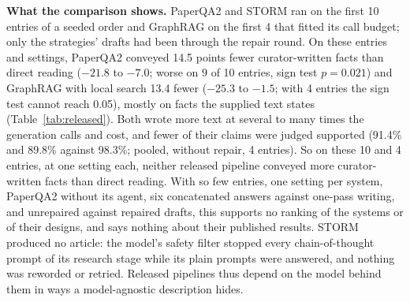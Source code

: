 \documentclass{article} %
\begin{document}
\textbf{What the comparison shows.} PaperQA2 and STORM ran on the first 10 entries of a seeded order and GraphRAG on the first 4 that fitted its call budget; only the strategies' drafts had been through the repair round. On these entries and settings, PaperQA2 conveyed 14.5 points fewer curator-written facts than direct reading ($-21.8$ to $-7.0$; worse on 9 of 10 entries, sign test $p=0.021$) and GraphRAG with local search 13.4 fewer ($-25.3$ to $-1.5$; with 4 entries the sign test cannot reach 0.05), mostly on facts the supplied text states (Table~\ref{tab:released}). Both wrote more text at several to many times the generation calls and cost, and fewer of their claims were judged supported (91.4\% and 89.8\% against 98.3\%; pooled, without repair, 4 entries). So on these 10 and 4 entries, at one setting each, neither released pipeline conveyed more curator-written facts than direct reading. With so few entries, one setting per system, PaperQA2 without its agent, six concatenated answers against one-pass writing, and unrepaired against repaired drafts, this supports no ranking of the systems or of their designs, and says nothing about their published results. STORM produced no article: the model's safety filter stopped every chain-of-thought prompt of its research stage while its plain prompts were answered, and nothing was reworded or retried. Released pipelines thus depend on the model behind them in ways a model-agnostic description hides.
\end{document}
